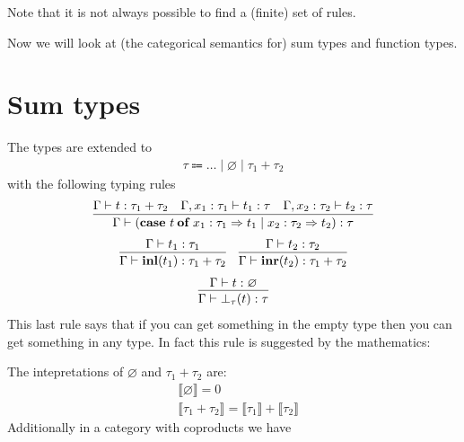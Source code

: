 Note that it is not always possible to find a (finite) set of rules.

Now we will look at (the categorical semantics for) sum types and function types.

\section{Sum types}

The types are extended to
\begin{align*}
    \tau \Coloneqq \ldots \mid \varnothing \mid \tau_1 + \tau_2
\end{align*}
with the following typing rules
\begin{align*}
    \infer{\Gamma \vdash (\eqncode{case}\ t \eqncode{of} x_1 : \tau_1 \Rightarrow
    t_1 \mid x_2 : \tau_2 \Rightarrow t_2) : \tau}
    {\Gamma \vdash t : \tau_1 + \tau_2 & \Gamma, x_1 : \tau_1 \vdash t_1 : \tau
    & \Gamma, x_2 : \tau_2 \vdash t_2 : \tau}
\end{align*}
\begin{align*}
    \infer{\Gamma \vdash \eqncode{inl}(t_1) : \tau_1 + \tau_2}
    {\Gamma \vdash t_1 : \tau_1}
    &&
    \infer{\Gamma \vdash \eqncode{inr}(t_2) : \tau_1 + \tau_2}
    {\Gamma \vdash t_2 : \tau_2}
\end{align*}
\begin{align*}
    \infer{\Gamma \vdash \bot_\tau(t) : \tau}
    {\Gamma \vdash t : \varnothing}
\end{align*}
This last rule says that if you can get something in the empty type then you can
get something in any type. In fact this rule is suggested by the mathematics:
\begin{center}
\end{center}
The intepretations of $\varnothing$ and $\tau_1 + \tau_2$ are:
\begin{align*}
    &\llbracket \varnothing \rrbracket = 0
    \\
    &\llbracket \tau_1 + \tau_2 \rrbracket = \llbracket \tau_1 \rrbracket +
    \llbracket \tau_2 \rrbracket
\end{align*}
Additionally in a category with coproducts we have
\begin{center}
\end{center}

